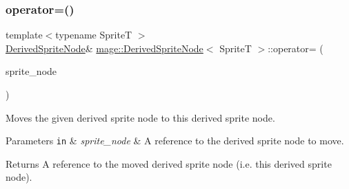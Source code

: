 \subsubsection{\texorpdfstring{operator=()}{operator=()}\hspace{0.1cm}{\footnotesize\ttfamily [2/2]}}
{\footnotesize\ttfamily template$<$typename SpriteT $>$ \\
\hyperlink{classmage_1_1_derived_sprite_node}{Derived\+Sprite\+Node}\& \hyperlink{classmage_1_1_derived_sprite_node}{mage\+::\+Derived\+Sprite\+Node}$<$ SpriteT $>$\+::operator= (\begin{DoxyParamCaption}\item[{\hyperlink{classmage_1_1_derived_sprite_node}{Derived\+Sprite\+Node}$<$ SpriteT $>$ \&\&}]{sprite\+\_\+node }\end{DoxyParamCaption})\hspace{0.3cm}{\ttfamily [delete]}}

Moves the given derived sprite node to this derived sprite node.


\begin{DoxyParams}[1]{Parameters}
\mbox{\tt in}  & {\em sprite\+\_\+node} & A reference to the derived sprite node to move. \\
\hline
\end{DoxyParams}
\begin{DoxyReturn}{Returns}
A reference to the moved derived sprite node (i.\+e. this derived sprite node). 
\end{DoxyReturn}

